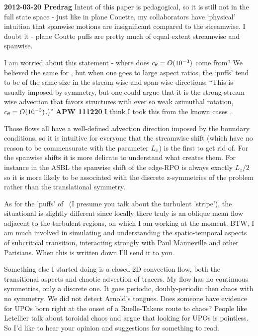 \begin{description}
{\bf 2012-03-20 Predrag}
Intent of this paper is pedagogical, so it is still not in the full state
space - just like in plane Couette, my collaborators have `physical'
intuition that spanwise motions are insignificant compared to the
streamwise. I doubt it - plane Coutte puffs are pretty much of equal
extent streamwise and spanwise.

\item[2011-11-15 PC~~]
I am worried about this statement - where does
    $c_\theta=O(10^{-3})$ come from? We believed the same for \pCf, but
    when one goes to large aspect ratios, the `puffs' tend to be of the
    same size in the stream-wise and span-wise directions:
``This is
usually imposed by symmetry, but one could argue that it is the strong
stream-wise advection that favors structures with  ever so weak azimuthal
rotation, $c_\theta=O(10^{-3})$.)''
{\bf APW 111220} I think I took this from the known cases
.

\item[2012-03-20 Johann~~]
Those flows all have a well-defined advection direction imposed by the
boundary conditions, so it is intuitive for everyone that the streamwise
shift (which have no reason to be commensurate with the parameter $L_x$) is
the first to get rid of. For the spanwise shifts it is more delicate to
understand what creates them. For instance in the ASBL the spanwise shift
of the edge-RPO is always exactly $L_z/2$ so it is more likely to be
associated with the discrete z-symmetries of the problem rather than the
translational symmetry.

As for the 'puffs' of \pCf\ (I presume you talk about the turbulent
'stripe'), the situational is slightly different since locally there truly
is an oblique mean flow adjacent to the turbulent regions, on which I am
working at the moment.  BTW, I am much involved in simulating and
understanding the spatio-temporal aspects of subcritical transition,
interacting strongly with Paul Manneville and other Parisians. When this
is written down I'll send it to you.

Something else I started doing is a closed 2D convection flow, both the
transitional aspects and chaotic advection of tracers. My flow has no
continuous symmetries, only a discrete one. It goes periodic,
doubly-periodic then chaos with no symmetry. We did not detect Arnold's
tongues. Does someone have evidence for UPOs born right at the onset of a
Ruelle-Takens route to chaos? People like Letellier talk about toroidal
chaos and argue that looking for UPOs is pointless. So I'd like to hear
your opinion and suggestions for something to read.

\end{description}


